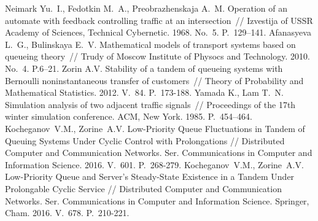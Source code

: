 \documentclass[60x84/16,10pt]{dccn}
\begin{document}
{\begin{thebibliography}{11}
   Neimark Yu.~I., Fedotkin M.~A., Preobrazhenskaja A.~M. Operation of an automate
  with feedback controlling traffic at an intersection~// Izvestija of USSR Academy of Sciences,
  Technical Cybernetic. 1968. No.~5. P.~129--141.
%
  Afanasyeva L.~G., Bulinskaya E.~V. Mathematical models of transport systems based on queueing
  theory~// Trudy of Moscow Institute of Physocs and Technology. 2010. No.~4. P.6--21. 
  Zorin A.V. Stability of a tandem of queueing systems with Bernoulli noninstantaneous transfer of
  customers~// Theory of Probability and Mathematical Statistics. 2012. V.~84. P.~173-188.
  Yamada K., Lam T.~N. Simulation analysis of two adjacent traffic signals~// Proceedings of the
  17th winter simulation conference. ACM, New York. 1985. P.~454--464.
Kocheganov~V.M., Zorine~A.V. Low-Priority Queue Fluctuations in Tandem of Queuing Systems Under Cyclic Control with Prolongations // Distributed Computer and Communication Networks. Ser. Communications in Computer and Information Science. 2016. V.~601. P.~268-279.
Kocheganov~V.M., Zorine~A.V. Low-Priority Queue and Server's Steady-State Existence in a Tandem Under Prolongable Cyclic Service // Distributed Computer and Communication Networks. Ser. Communications in Computer and Information Science. Springer, Cham. 2016. V.~678. P.~210-221.
\end{thebibliography}

% 
% 


} %
\end{document}
